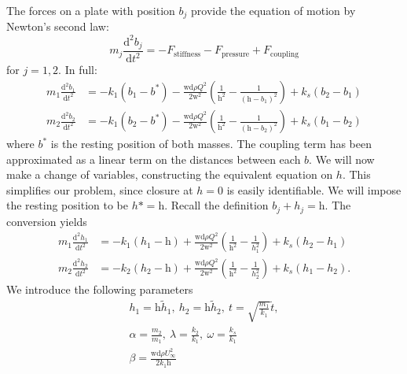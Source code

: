 The forces on a plate with position $b_j$ provide the equation of motion by Newton's second law:
\begin{equation}
    m_j\frac{\mathrm{d}^2 b_j}{\mathrm{d}t^2} = -F_\mathrm{stiffness} - F_\mathrm{pressure} + F_\mathrm{coupling}
\end{equation}
for $j=1,2$. In full:
\begin{equation}
    \begin{aligned}
        m_1\frac{\mathrm{d}^2 b_1}{\mathrm{d}t^2} &= -k_1(b_1 - b^*) - \frac{\mathrm{wd}\rho Q^2}{2\mathrm{w}^2}\left(\frac{1}{\mathrm{h}^2} - \frac{1}{(\mathrm{h}-b_1)^2} \right) + k_s(b_2-b_1) \\
        m_2\frac{\mathrm{d}^2 b_2}{\mathrm{d}t^2} &= -k_1(b_2 - b^*) - \frac{\mathrm{wd}\rho Q^2}{2\mathrm{w}^2}\left(\frac{1}{\mathrm{h}^2} - \frac{1}{(\mathrm{h}-b_2)^2} \right) + k_s(b_1-b_2)
    \end{aligned}
\end{equation}
where $b^*$ is the resting position of both masses.
The coupling term has been approximated as a linear term on the distances between each $b$.
We will now make a change of variables, constructing the equivalent equation on $h$.
This simplifies our problem, since closure at $h=0$ is easily identifiable.
We will impose the resting position to be $h* = \mathrm{h}$. Recall the definition $b_j + h_j = \mathrm{h}$.
The conversion yields
\begin{equation}
    \begin{aligned}
        m_1\frac{\mathrm{d}^2 h_1}{\mathrm{d}t^2} &= -k_1(h_1 - \mathrm{h}) + \frac{\mathrm{wd}\rho Q^2}{2\mathrm{w}^2}\left(\frac{1}{\mathrm{h}^2} - \frac{1}{h_1^2} \right) + k_s(h_2-h_1) \\
        m_2\frac{\mathrm{d}^2 h_2}{\mathrm{d}t^2} &= -k_2(h_2 - \mathrm{h}) + \frac{\mathrm{wd}\rho Q^2}{2\mathrm{w}^2}\left(\frac{1}{\mathrm{h}^2} - \frac{1}{h_2^2} \right) + k_s(h_1-h_2).
    \end{aligned}
\end{equation}
We introduce the following parameters
\begin{equation*}
    \begin{aligned}
        h_1 = \mathrm{h}\tilde{h}_1,~h_2 = \mathrm{h}\tilde{h}_2,~t=\sqrt{\frac{m_1}{k_1}}\tilde{t}, \\
        \alpha = \frac{m_2}{m_1},~\lambda = \frac{k_2}{k_1},~\omega = \frac{k_s}{k_1} \\
        \beta = \frac{\mathrm{wd}\rho U_\infty^2}{2k_1\mathrm{h}}
    \end{aligned}
\end{equation*}
